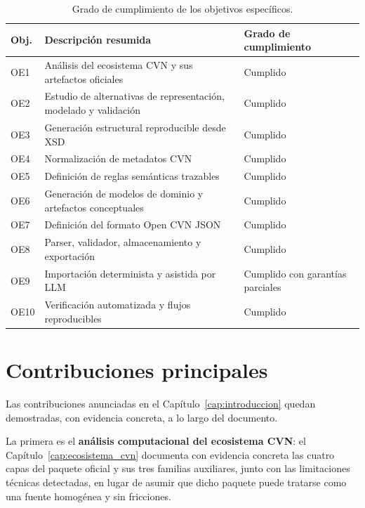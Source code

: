 \begin{table}[htbp]
  \centering
  \small
  \renewcommand{\arraystretch}{1.15}
  \begin{tabular}{p{} p{} p{}}
    \hline
    \textbf{Obj.} & \textbf{Descripción resumida} & \textbf{Grado de cumplimiento} \\
    \hline
    OE1 & Análisis del ecosistema CVN y sus artefactos oficiales & Cumplido \\
    OE2 & Estudio de alternativas de representación, modelado y validación & Cumplido \\
    OE3 & Generación estructural reproducible desde XSD & Cumplido \\
    OE4 & Normalización de metadatos CVN & Cumplido \\
    OE5 & Definición de reglas semánticas trazables & Cumplido \\
    OE6 & Generación de modelos de dominio y artefactos conceptuales & Cumplido \\
    OE7 & Definición del formato Open CVN JSON & Cumplido \\
    OE8 & Parser, validador, almacenamiento y exportación & Cumplido \\
    OE9 & Importación determinista y asistida por LLM & Cumplido con garantías parciales \\
    OE10 & Verificación automatizada y flujos reproducibles & Cumplido \\
    \hline
  \end{tabular}
  \caption{Grado de cumplimiento de los objetivos específicos.}
  \label{tab:conclusiones_objetivos}
\end{table}

\section{Contribuciones principales}
\label{sec:conclusiones_contribuciones}

Las contribuciones anunciadas en el Capítulo~\ref{cap:introduccion} quedan
demostradas, con evidencia concreta, a lo largo del documento.

La primera es el \textbf{análisis computacional del ecosistema CVN}: el
Capítulo~\ref{cap:ecosistema_cvn} documenta con evidencia concreta las
cuatro capas del paquete oficial y sus tres familias auxiliares, junto con
las limitaciones técnicas detectadas, en lugar de asumir que dicho paquete
puede tratarse como una fuente homogénea y sin fricciones.


